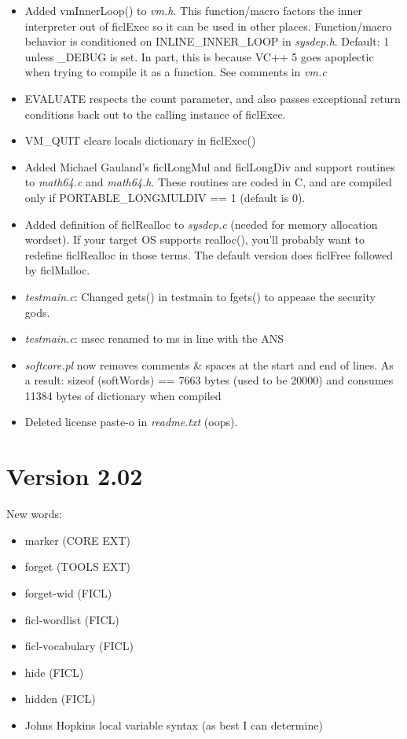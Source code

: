 \begin{itemize}[noitemsep]
	\item Added vmInnerLoop() to \textit{vm.h}. This function/macro
	factors the inner  interpreter out of ficlExec so it can be used
	in other places. Function/macro behavior is conditioned on
	INLINE\_INNER\_LOOP in \textit{sysdep.h}. Default: 1 unless
	\_DEBUG is set. In part, this is because VC++ 5 goes apoplectic
	when trying to compile it as a function. See comments in
	\textit{vm.c}

	\item EVALUATE respects the count parameter, and also passes
	exceptional return conditions back out to the calling instance
	of ficlExec.

	\item VM\_QUIT clears locals dictionary in ficlExec()

	\item Added Michael Gauland's ficlLongMul and ficlLongDiv and
	support routines to \textit{math64.c} and \textit{math64.h}.
	These routines are coded in C, and are compiled only if
	PORTABLE\_LONGMULDIV == 1 (default is 0).

	\item Added definition of ficlRealloc to \textit{sysdep.c}
	(needed for memory allocation wordset). If your target OS
	supports realloc(), you'll probably want to redefine ficlRealloc
	in those terms. The default version does ficlFree followed by
	ficlMalloc.

	\item \textit{testmain.c}: Changed gets() in testmain to fgets()
	to appease the security gods.

	\item \textit{testmain.c}: msec renamed to ms in line with the
	ANS

	\item \textit{softcore.pl} now removes comments \& spaces at the
	start and end of lines. As a result: sizeof (softWords) == 7663
	bytes (used to be 20000)  and consumes 11384 bytes of dictionary
	when compiled

	\item Deleted license paste-o in \textit{readme.txt} (oops).
\end{itemize}


\section*{Version 2.02}
New words:
\begin{itemize}[noitemsep]
	\item marker        (CORE EXT)
	\item forget       (TOOLS EXT)
	\item forget-wid        (FICL)
	\item ficl-wordlist     (FICL)
	\item ficl-vocabulary   (FICL)
	\item hide              (FICL)
	\item hidden            (FICL)
	\item Johns Hopkins local variable syntax (as best I can determine)
\end{itemize}



